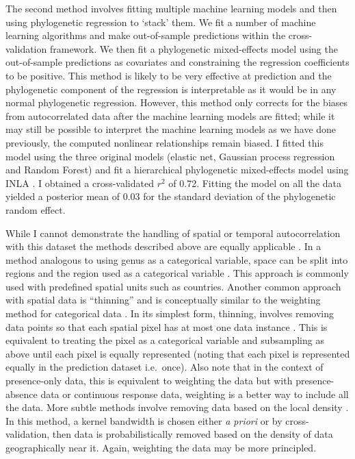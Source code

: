 \documentclass[10pt,]{article}
\begin{document}
The second method involves fitting multiple machine learning models and then using phylogenetic regression to `stack' them.
We fit a number of machine learning algorithms and make out-of-sample predictions within the cross-validation framework.
We then fit a phylogenetic mixed-effects model using the out-of-sample predictions as covariates and constraining the regression coefficients to be positive.
This method is likely to be very effective at prediction and the phylogenetic component of the regression is interpretable as it would be in any normal phylogenetic regression.
However, this method only corrects for the biases from autocorrelated data after the machine learning models are fitted; while it may still be possible to interpret the machine learning models as we have done previously, the computed nonlinear relationships remain biased.
I fitted this model using the three original models (elastic net, Gaussian process regression and Random Forest) and fit a hierarchical phylogenetic mixed-effects model using INLA \citep{INLA}.
I obtained a cross-validated \(r^2\) of 0.72.
Fitting the model on all the data yielded a posterior mean of 0.03 for the standard deviation of the phylogenetic random effect.

While I cannot demonstrate the handling of spatial or temporal autocorrelation with this dataset the methods described above are equally applicable \citep{elith2009species}.
In a method analogous to using genus as a categorical variable, space can be split into regions and the region used as a categorical variable \citep{appelhans2015evaluating}.
This approach is commonly used with predefined spatial units such as countries.
Another common approach with spatial data is ``thinning'' and is conceptually similar to the weighting method for categorical data \cite{elith2010art}.
In its simplest form, thinning, involves removing data points so that each spatial pixel has at most one data instance \citep{elith2010art, verbruggen2013improving}.
This is equivalent to treating the pixel as a categorical variable and subsampling as above until each pixel is equally represented (noting that each pixel is represented equally in the prediction dataset i.e.~once).
Also note that in the context of presence-only data, this is equivalent to weighting the data but with presence-absence data or continuous response data, weighting is a better way to include all the data.
More subtle methods involve removing data based on the local density \citep{verbruggen2013improving}.
In this method, a kernel bandwidth is chosen either \emph{a priori} or by cross-validation, then data is probabilistically removed based on the density of data geographically near it.
Again, weighting the data may be more principled.
\end{document}
